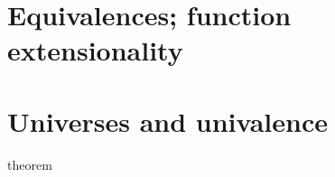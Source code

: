 \section{Equivalences; function extensionality}
\label{sec:equivalences}

\section{Universes and univalence}
\label{sce:universes}

\begin{theorem} theorem \end{theorem}

